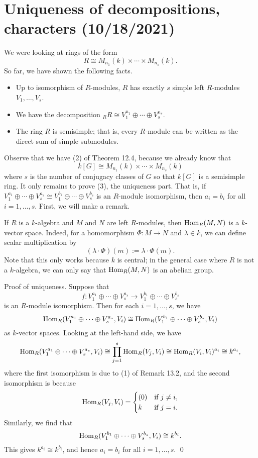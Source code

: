 \section{Uniqueness of decompositions, characters (10/18/2021)}
We were looking at rings of the form 
\[ R \cong M_{n_1}(k) \times \cdots \times M_{n_s}(k). \] 
So far, we have shown the following facts. 
\begin{itemize}
    \item Up to isomorphism of $R$-modules, $R$ has exactly $s$ simple left 
    $R$-modules $V_1, \dots, V_s$. 
    \item We have the decomposition ${}_R R \cong V_1^{n_1} \oplus \cdots 
    \oplus V_s^{n_s}$. 
    \item The ring $R$ is semisimple; that is, every $R$-module can be 
    written as the direct sum of simple submodules. 
\end{itemize}

Observe that we have (2) of Theorem 12.4, because we already know that 
\[ k[G] \cong M_{n_1}(k) \times \cdots \times M_{n_s}(k) \] 
where $s$ is the number of conjugacy classes of $G$ so that $k[G]$ is a 
semisimple ring. It only remains to prove (3), the uniqueness part.
That is, if $V_1^{a_1} \oplus \cdots \oplus V_s^{a_s} \cong V_1^{b_1} 
\oplus \cdots \oplus V_s^{b_s}$ is an $R$-module isomorphism, then 
$a_i = b_i$ for all $i = 1, \dots, s$. First, we will make a remark. 

\begin{remark}{}
    If $R$ is a $k$-algebra and $M$ and $N$ are left $R$-modules, then 
    $\operatorname{Hom}_R(M, N)$ is a $k$-vector space. Indeed, for a homomorphism 
    $\Phi : M \to N$ and $\lambda \in k$, we can define scalar multiplication by 
    \[ (\lambda \cdot \Phi)(m) := \lambda \cdot \Phi(m). \] 
    Note that this only works because $k$ is central; in the general case where 
    $R$ is not a $k$-algebra, we can only say that $\operatorname{Hom}_R(M, N)$ is an abelian 
    group. 
\end{remark}

{\sc Proof of uniqueness.} Suppose that 
\[ f : V_1^{a_1} \oplus \cdots \oplus V_s^{a_s} \to V_1^{b_1} \oplus \cdots 
\oplus V_s^{b_s} \] 
is an $R$-module isomorphism. Then for each $i = 1, \dots, s$, we have 
\[ \operatorname{Hom}_R(V_1^{a_1} \oplus \cdots \oplus V_s^{a_s}, V_i) 
\cong \operatorname{Hom}_R(V_1^{b_1} \oplus \cdots \oplus V_s^{b_s}, V_i) \] 
as $k$-vector spaces. Looking at the left-hand side, we have 
\[ \operatorname{Hom}_R(V_1^{a_1} \oplus \cdots \oplus V_s^{a_s}, V_i) 
\cong \prod_{j=1}^s \operatorname{Hom}_R(V_j, V_i) \cong \operatorname{Hom}_R(V_i, V_i)^{a_i} \cong k^{a_i}, \] 
where the first isomorphism is due to (1) of Remark 13.2, and the second isomorphism
is because 
\[ \operatorname{Hom}_R(V_j, V_i) = \begin{cases} (0) & \text{if } j \neq i, \\ 
    k & \text{if } j = i. \end{cases} \] 
Similarly, we find that 
\[ \operatorname{Hom}_R(V_1^{b_1} \oplus \cdots \oplus V_s^{b_s}, V_i) \cong k^{b_i}. \] 
This gives $k^{a_i} \cong k^{b_i}$, and hence $a_i = b_i$ for all $i = 1, \dots, s$. \qed


